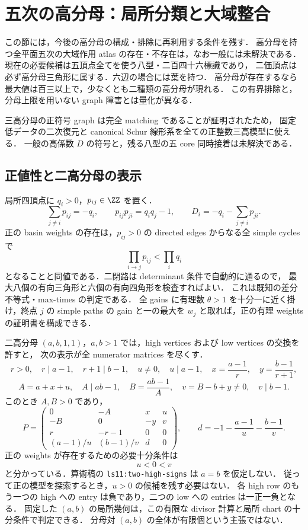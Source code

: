 \section{五次の高分母：局所分類と大域整合}
\label{nt18:denominators}

この節には，今後の高分母の構成・排除に再利用する条件を残す．
高分母を持つ全平面五次の大域作用 atlas の存在・不存在は，なお一般には未解決である．
現在の必要候補は五頂点全てを使う八型・二百四十六標識であり，
二価頂点は必ず高分母三角形に属する．六辺の場合には葉を持つ．
高分母が存在するなら最大値は百三以上で，少なくとも二種類の高分母が現れる．
この有界排除と，分母上限を用いない graph 障害とは量化が異なる．

三高分母の正符号 graph は完全 matching であることが証明されたため，
固定低データの二次復元と canonical Schur 線形系を全ての正整数三高模型に使える．
一般の高係数 $D$ の符号と，残る八型の五 core 同時接着は未解決である．

\subsection{正値性と二高分母の表示}

局所四頂点に $q_i>0$，$p_{ij}\in\ZZ$ を置く．
\[
 \sum_{j\ne i}p_{ij}=-q_i,\qquad
 p_{ij}p_{ji}=q_iq_j-1,\qquad
 D_i=-q_i-\sum_{j\ne i}p_{ji}.
\]
正の basin weights の存在は，$p_{ij}>0$ の directed edges からなる全 simple cycles で
\[
 \prod_{i\to j}p_{ij}<\prod_iq_i
\]
となることと同値である．二閉路は determinant 条件で自動的に通るので，
最大八個の有向三角形と六個の有向四角形を検査すればよい．
これは既知の差分不等式・max-times の判定\cite[\S2]{SergeevSchneiderButkovic}である．
全 gains に有理数 $\theta>1$ を十分一に近く掛け，終点 $j$ の simple paths の gain と一の最大を
$w_j$ と取れば，正の有理 weights の証明書を構成できる．

二高分母 $(a,b,1,1)$，$a,b>1$ では，high vertices および low vertices の交換を許すと，
次の表示が全 numerator matrices を尽くす．
\[
 r>0,\quad r\mid a-1,\quad r+1\mid b-1,\quad
 u\ne0,\quad u\mid a-1,\quad
 x=\frac{a-1}{r},\quad y=\frac{b-1}{r+1},
\]
\[
 A=a+x+u,\quad A\mid ab-1,\quad
 B=\frac{ab-1}{A},\quad v=B-b+y\ne0,\quad v\mid b-1.
\]
このとき $A,B>0$ であり，
\[
 P=\begin{pmatrix}
 0&-A&x&u\\
 -B&0&-y&v\\
 r&-r-1&0&0\\
 (a-1)/u&(b-1)/v&d&0
 \end{pmatrix},\qquad
 d=-1-\frac{a-1}{u}-\frac{b-1}{v}.
\]
正の weights が存在するための必要十分条件は
\[
 u<0<v
\]
と分かっている．算術稿の \texttt{ls11:two-high-signs} は $a=b$ を仮定しない．
従って正の模型を探索するとき，$u>0$ の候補を残す必要はない．
各 high row のもう一つの high への entry は負であり，二つの low への entries は一正一負となる．
固定した $(a,b)$ の局所幾何は，この有限な divisor 計算と局所 chart の十分条件で判定できる．
分母対 $(a,b)$ の全体が有限個という主張ではない．


